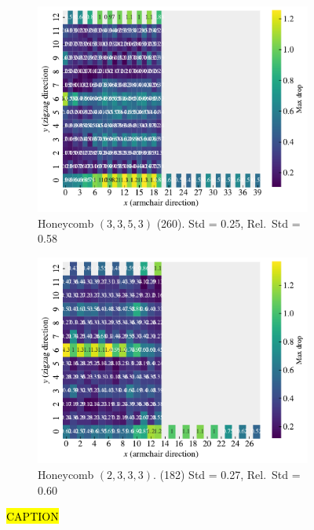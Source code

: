 \begin{figure}[H]
  \hfill
  \begin{subfigure}[t]{0.49\textwidth}
      \centering
      \includegraphics[width=\textwidth]{figures/search/ref_search_drop_hon_3_3_5_3_ref_search.pdf}
      \caption{Honeycomb $(3,3,5,3)$ (260). Std = 0.25, Rel.\ Std = 0.58}
  \end{subfigure}
  \hfill
  \begin{subfigure}[t]{0.49\textwidth}
      \centering
      \includegraphics[width=\textwidth]{figures/search/ref_search_drop_hon_2_3_3_3_ref_search.pdf}
      \caption{Honeycomb $(2,3,3,3)$. (182)  Std = 0.27, Rel.\ Std = 0.60}
  \end{subfigure}
  \hfill
  \caption{\hl{CAPTION}}
  \label{fig:ref_search_top_data}
\end{figure}



